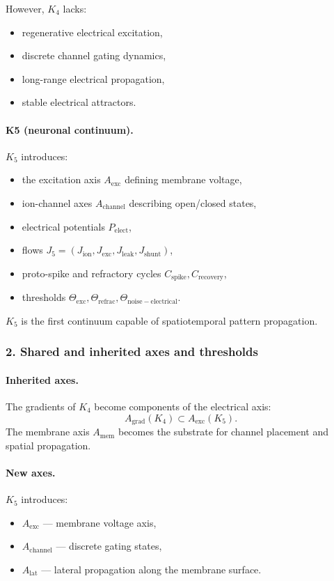 However, $K_4$ lacks:
\begin{itemize}
  \item regenerative electrical excitation,
  \item discrete channel gating dynamics,
  \item long-range electrical propagation,
  \item stable electrical attractors.
\end{itemize}

\paragraph{K5 (neuronal continuum).}
$K_5$ introduces:
\begin{itemize}
  \item the excitation axis $A_{\mathrm{exc}}$ defining membrane voltage,
  \item ion-channel axes $A_{\mathrm{channel}}$ describing open/closed states,
  \item electrical potentials $P_{\mathrm{elect}}$,
  \item flows $J_5 = (J_{\mathrm{ion}}, J_{\mathrm{exc}}, J_{\mathrm{leak}},
        J_{\mathrm{shunt}})$,
  \item proto-spike and refractory cycles $C_{\mathrm{spike}},C_{\mathrm{recovery}}$,
  \item thresholds $\Theta_{\mathrm{exc}}, \Theta_{\mathrm{refrac}},
        \Theta_{\mathrm{noise-electrical}}$.
\end{itemize}

$K_5$ is the first continuum capable of spatiotemporal pattern propagation.

\subsubsection{2. Shared and inherited axes and thresholds}

\paragraph{Inherited axes.}
The gradients of $K_4$ become components of the electrical axis:
\[
A_{\mathrm{grad}}(K_4) \subset A_{\mathrm{exc}}(K_5).
\]
The membrane axis $A_{\mathrm{mem}}$ becomes the substrate for channel
placement and spatial propagation.

\paragraph{New axes.}
$K_5$ introduces:
\begin{itemize}
  \item $A_{\mathrm{exc}}$ — membrane voltage axis,
  \item $A_{\mathrm{channel}}$ — discrete gating states,
  \item $A_{\mathrm{lat}}$ — lateral propagation along the membrane surface.
\end{itemize}

